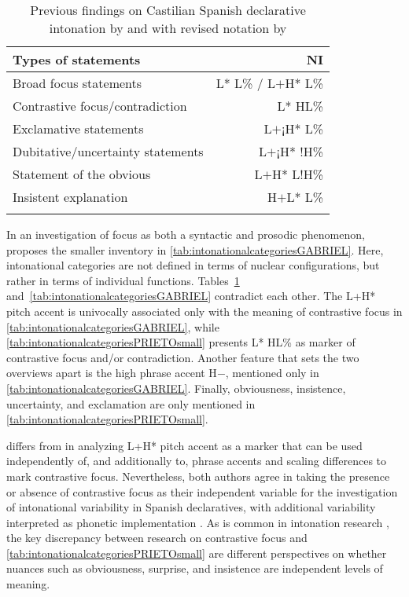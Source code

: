 \vfill
\begin{table}[H]
\begin{tabular}{lr}
 \lsptoprule
 Types of statements & \acf{NI} \\
 \midrule
 Broad focus statements & L* L\% / L$+$H* L\% \\
 Contrastive focus\slash contradiction & L* HL\%  \\
 Exclamative statements                     & L$+$¡H* L\%  \\
 Dubitative/uncertainty statements          & L$+$¡H* !H\% \\
 Statement of the obvious                     & L$+$H* L!H\%  \\
 Insistent explanation                      & H$+$L* L\%\\
\lspbottomrule
\end{tabular}
	\caption{Previous findings on Castilian Spanish declarative intonation by \citet{Prieto2010.2014.Atlas} and \citet{EstebasVilaplanaPrieto.2010} with revised notation by \citet{HualdePrieto2015}\label{tab:intonationalcategoriesPRIETOsmall}}
\end{table}
\vfill
\pagebreak

In an investigation of focus as both a syntactic and prosodic phenomenon, \citet{Gabriel2007} proposes the smaller inventory in \autoref{tab:intonationalcategoriesGABRIEL}. Here, intonational categories are not defined in terms of nuclear configurations, but rather in terms of individual functions. Tables~\ref{tab:intonationalcategoriesPRIETOsmall} and~\ref{tab:intonationalcategoriesGABRIEL} contradict each other. The L+H* pitch accent is univocally associated only with the meaning of contrastive focus in \autoref{tab:intonationalcategoriesGABRIEL}, while \autoref{tab:intonationalcategoriesPRIETOsmall} presents L* HL\% as marker of contrastive focus and/or contradiction. Another feature that sets the two overviews apart is the high phrase accent H$-$, mentioned only in \autoref{tab:intonationalcategoriesGABRIEL}. Finally, obviousness, insistence, uncertainty, and exclamation are only mentioned in \autoref{tab:intonationalcategoriesPRIETOsmall}.

\citet{Face.2001,Face2001,Face2002} differs from \citet{Gabriel2007} in analyzing L+H* pitch accent as a marker that can be used independently of, and additionally to, phrase accents and scaling differences to mark contrastive focus. Nevertheless, both authors agree in taking the presence or absence of contrastive focus as their independent variable for the investigation of intonational variability in Spanish declaratives, with additional variability interpreted as phonetic implementation \citep[175]{Gabriel2007,Face2002}. As is common in intonation research \citep[102]{Ladd.1980}, the key discrepancy between research on contrastive focus and \autoref{tab:intonationalcategoriesPRIETOsmall} are different perspectives on whether nuances such as obviousness, surprise, and insistence are independent levels of meaning.

